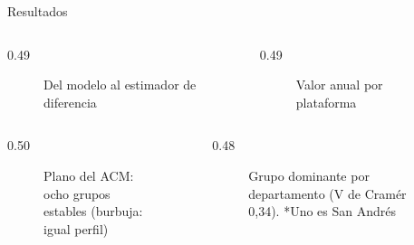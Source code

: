 \begin{frame}[t]
\begin{columns}[t]
\begin{column}{\colwidth}
\begin{minipage}[t][\altocolumnas][s]{\linewidth}
\end{minipage}
\end{column}

\separatorcolumn

\begin{column}{\colwidth}
\begin{minipage}[t][\altocolumnas][s]{\linewidth}

  \begin{block}{Resultados}
    \begin{columns}[t]
      \begin{column}{0.49\linewidth}
        \begin{figure}
          \centering
          
          \caption{Del modelo al estimador de diferencia}
        \end{figure}
      \end{column}
      \begin{column}{0.49\linewidth}
        \begin{figure}
          \centering
          
          \caption{Valor anual por plataforma}
        \end{figure}
      \end{column}
    \end{columns}

    \begin{columns}[t]
      \begin{column}{0.50\linewidth}
        \begin{figure}
          \centering
          
          \caption{Plano del ACM: ocho grupos estables (burbuja: igual perfil)}
        \end{figure}
      \end{column}
      \begin{column}{0.48\linewidth}
        \begin{figure}
          \centering
          
          \caption{Grupo dominante por departamento (V de Cramér 0,34). *Uno es San Andrés}
        \end{figure}
      \end{column}
    \end{columns}


\end{block}
\end{minipage}
\end{column}
\end{columns}
\end{frame}
